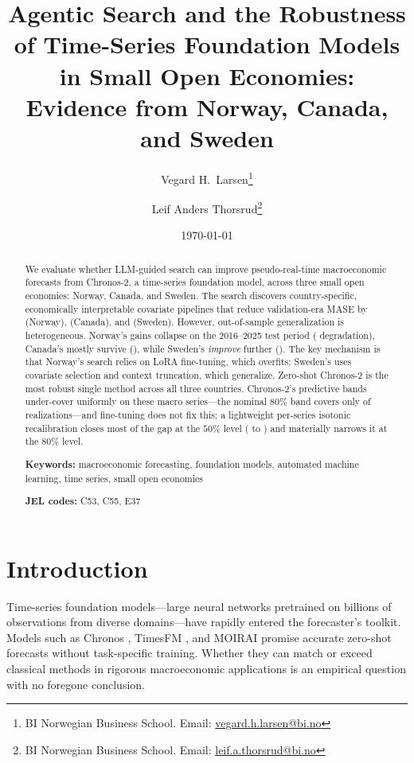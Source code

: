 \documentclass[12pt,a4paper]{article}
\title{Agentic Search and the Robustness of Time-Series Foundation Models\\in Small Open Economies: Evidence from Norway, Canada, and Sweden}
\author{
    Vegard H.\ Larsen\thanks{BI Norwegian Business School. Email: \href{mailto:vegard.h.larsen@bi.no}{vegard.h.larsen@bi.no}}
    \and
    Leif Anders Thorsrud\thanks{BI Norwegian Business School. Email: \href{mailto:leif.a.thorsrud@bi.no}{leif.a.thorsrud@bi.no}}
}
\date{\today}
\begin{document}


\maketitle

\begin{abstract}
We evaluate whether LLM-guided search can improve pseudo-real-time macroeconomic forecasts from Chronos-2, a time-series foundation model, across three small open economies: Norway, Canada, and Sweden. The search discovers country-specific, economically interpretable covariate pipelines that reduce validation-era MASE by \norValGainPct{} (Norway), \canValGainPct{} (Canada), and \sweValGainPct{} (Sweden). However, out-of-sample generalization is heterogeneous. Norway's gains collapse on the 2016--2025 test period (\norTestGapPct{} degradation), Canada's mostly survive (\canTestGapPct), while Sweden's \emph{improve} further (\sweTestGapPct). The key mechanism is that Norway's search relies on LoRA fine-tuning, which overfits; Sweden's uses covariate selection and context truncation, which generalize. Zero-shot Chronos-2 is the most robust single method across all three countries. Chronos-2's predictive bands under-cover uniformly on these macro series---the nominal $80\%$ band covers only \pooledFTeighty{} of realizations---and fine-tuning does not fix this; a lightweight per-series isotonic recalibration closes most of the gap at the $50\%$ level (\pooledFTfifty{} to \pooledCalfifty{}) and materially narrows it at the $80\%$ level.

\bigskip
\noindent\textbf{Keywords:} macroeconomic forecasting, foundation models, automated machine learning, time series, small open economies

\noindent\textbf{JEL codes:} C53, C55, E37
\end{abstract}


\section{Introduction}
\label{sec:introduction}

Time-series foundation models---large neural networks pretrained on billions of observations from diverse domains---have rapidly entered the forecaster's toolkit. Models such as Chronos \citep{ansari2024chronos,ansari2025chronos2}, TimesFM \citep{das2024decoder}, and MOIRAI \citep{woo2024unified} promise accurate zero-shot forecasts without task-specific training. Whether they can match or exceed classical methods in rigorous macroeconomic applications is an empirical question with no foregone conclusion.
\end{document}
